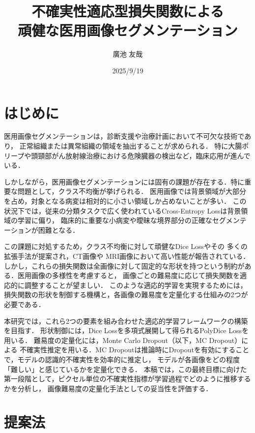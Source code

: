\documentclass[10pt, a4paper, twocolumn]{jarticle}
\title{不確実性適応型損失関数による \\
頑健な医用画像セグメンテーション}
\author{廣池 友哉}
\affiliation{広島大学 大学院先進理工系科学研究科 情報科学プログラム}
\date{2025/9/19}
\begin{document}
\maketitle


\section{はじめに}
医用画像セグメンテーションは，診断支援や治療計画において不可欠な技術であり，
正常組織または異常組織の領域を抽出することが求められる．
特に大腸ポリープ\cite{ji2022video}や頭頸部がん放射線治療における危険臓器\cite{maleki2020machine}の検出など，臨床応用が進んでいる．

しかしながら，医用画像セグメンテーションには固有の課題が存在する．特に重要な問題として，クラス不均衡が挙げられる．
医用画像では背景領域が大部分を占め，対象となる病変は相対的に小さい領域しか占めないことが多い．
この状況下では，従来の分類タスクで広く使われているCross-Entropy Loss\cite{long2015fully}は背景領域の学習に偏り，
臨床的に重要な小病変や曖昧な境界部分の正確なセグメンテーションが困難となる．

この課題に対処するため，クラス不均衡に対して頑健なDice Loss\cite{milletari2016v}やその
多くの拡張手法が提案され，CT画像\cite{zhu2019anatomynet, 9109297}や
MRI画像\cite{KATO2024107695}において高い性能が報告されている．
しかし，これらの損失関数は全画像に対して固定的な形状を持つという制約がある．医用画像の多様性を考慮すると，
画像ごとの難易度に応じて損失関数を適応的に調整することが望ましい．
このような適応的学習を実現するためには，損失関数の形状を制御する機構と，各画像の難易度を定量化する仕組みの2つが必要である．

本研究では，これら2つの要素を組み合わせた適応的学習フレームワークの構築を目指す．
形状制御には，Dice Lossを多項式展開して得られるPolyDice Loss\cite{polydice}を用いる．
難易度の定量化には，Monte Carlo Dropout\cite{pmlr-v48-gal16}（以下，MC Dropout）による
不確実性推定を用いる．MC Dropoutは推論時にDropoutを有効にすることで，モデルの認識的不確実性を効率的に推定し，
モデルが各画像をどの程度「難しい」と感じているかを定量化できる．
本稿では，この最終目標に向けた第一段階として，ピクセル単位の不確実性指標が学習過程でどのように推移するかを分析し，
画像難易度の定量化手法としての妥当性を評価する．
\section{提案法}
\end{document}
